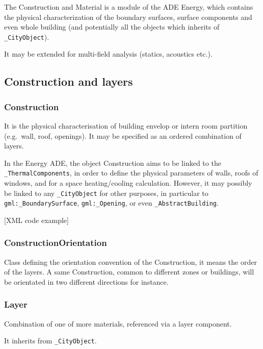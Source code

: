 \documentclass[a4paper,12pt]{article}
\begin{document}
The Construction and Material is a module of the ADE Energy, which
contains the physical characterization of the boundary surfaces, surface
components and even whole building (and potentially all the objects
which inherits of \texttt{\_CityObject}).

It may be extended for multi-field analysis (statics, acoustics etc.).

\subsection{Construction and layers}\label{construction-and-layers}

\subsubsection{Construction}\label{construction}

It is the physical characterisation of building envelop or intern room
partition (e.g.~wall, roof, openings). It may be specified as an ordered
combination of layers.

In the Energy ADE, the object Construction aims to be linked to the
\texttt{\_ThermalComponents}, in order to define the physical parameters
of walls, roofs of windows, and for a space heating/cooling calculation.
However, it may possibly be linked to any \texttt{\_CityObject} for
other purposes, in particular to \texttt{gml:\_BoundarySurface},
\texttt{gml:\_Opening}, or even \texttt{\_AbstractBuilding}.

{[}XML code example{]}

\subsubsection{ConstructionOrientation}\label{constructionorientation}

Class defining the orientation convention of the Construction, it means
the order of the layers. A same Construction, common to different zones
or buildings, will be orientated in two different directions for
instance.

\subsubsection{Layer}\label{layer}

Combination of one of more materials, referenced via a layer component.

It inherits from \texttt{\_CityObject}.
\end{document}
